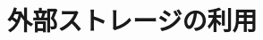 \documentclass[main]{subfiles}
\begin{document}
\chapter{外部ストレージの利用}
\fontsize{10.2}{10} \selectfont
\end{document}
